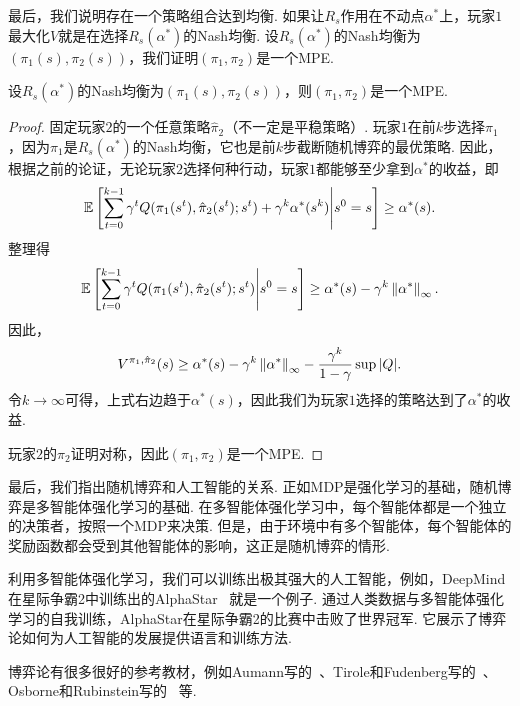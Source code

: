 最后，我们说明存在一个策略组合达到均衡. 如果让$R_s$作用在不动点$\alpha^*$上，玩家$1$最大化$V$就是在选择$R_s(\alpha^*)$的Nash均衡. 设$R_s(\alpha^*)$的Nash均衡为$(\pi_1(s),\pi_2(s))$，我们证明$(\pi_1,\pi_2)$是一个MPE. 

\begin{lemma}
    设$R_s(\alpha^*)$的Nash均衡为$(\pi_1(s),\pi_2(s))$，则$(\pi_1,\pi_2)$是一个MPE.
\end{lemma}

\begin{proof}
固定玩家$2$的一个任意策略$\hat{\pi}_2$（不一定是平稳策略）. 玩家$1$在前$k$步选择$\pi_1$，因为$\pi_1$是$R_s(\alpha^*)$的Nash均衡，它也是前$k$步截断随机博弈的最优策略. 因此，根据之前的论证，无论玩家$2$选择何种行动，玩家$1$都能够至少拿到$\alpha^*$的收益，即
\[\mathbb{E}\left[\sum_{t=0}^{k-1}\gamma^tQ(\pi_1(s^t),\hat{\pi}_2(s^t);s^t)+\gamma^k\alpha^*(s^k)\middle|s^0=s\right]\ge \alpha^*(s).\]
整理得
\[\mathbb{E}\left[\sum_{t=0}^{k-1}\gamma^tQ(\pi_1(s^t),\hat{\pi}_2(s^t);s^t)\middle|s^0=s\right]\ge \alpha^*(s)-\gamma^k\left\|\alpha^*\right\|_\infty.\]
因此，
\[V^{\pi_1,\hat{\pi}_2}(s)\ge \alpha^*(s) - \gamma^k\left\|\alpha^*\right\|_\infty - \frac{\gamma^k}{1-\gamma}\sup|Q|.\]
令$k\to\infty$可得，上式右边趋于$\alpha^*(s)$，因此我们为玩家$1$选择的策略达到了$\alpha^*$的收益. 

玩家$2$的$\pi_2$证明对称，因此$(\pi_1,\pi_2)$是一个MPE.
\end{proof}

最后，我们指出随机博弈和人工智能的关系. 正如MDP是强化学习的基础，随机博弈是多智能体强化学习的基础. 在多智能体强化学习中，每个智能体都是一个独立的决策者，按照一个MDP来决策. 但是，由于环境中有多个智能体，每个智能体的奖励函数都会受到其他智能体的影响，这正是随机博弈的情形. 

利用多智能体强化学习，我们可以训练出极其强大的人工智能，例如，DeepMind在星际争霸2中训练出的AlphaStar~\cite{vinyalsGrandmasterLevelStarCraft2019} 就是一个例子. 通过人类数据与多智能体强化学习的自我训练，AlphaStar在星际争霸2的比赛中击败了世界冠军. 它展示了博弈论如何为人工智能的发展提供语言和训练方法. 

\begin{remark}
    博弈论有很多很好的参考教材，例如Aumann写的~\cite{aumannLecturesGameTheory1989}、Tirole和Fudenberg写的~\cite{fudenbergGameTheory1991}、Osborne和Rubinstein写的~\cite{osborneCourseGameTheory1994} 等.
\end{remark}

